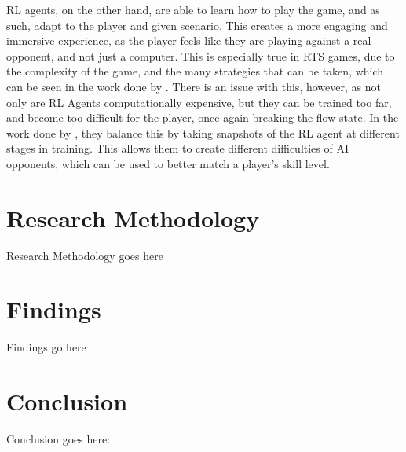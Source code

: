 \documentclass[conference]{IEEEtran}
\begin{document}
RL agents, on the other hand, are able to learn how to play the game, and as such, adapt to the player and given scenario. This creates a more engaging
and immersive experience, as the player feels like they are playing against a real opponent, and not just a computer. This is especially true in RTS games,
due to the complexity of the game, and the many strategies that can be taken, which can be seen in the work done by \cite{vinyals_grandmaster_2019}.
There is an issue with this, however, as not only are RL Agents computationally expensive, but they can be trained too far, and become too difficult for the player,
once again breaking the flow state. In the work done by \cite{grech_creating_2023}, they balance this by taking snapshots of the RL agent at different
stages in training. This allows them to create different difficulties of AI opponents, which can be used to better match a player's skill level. 



\section{Research Methodology}





Research Methodology goes here

\section{Findings}

Findings go here

\section{Conclusion}

Conclusion goes here:



\end{document}
